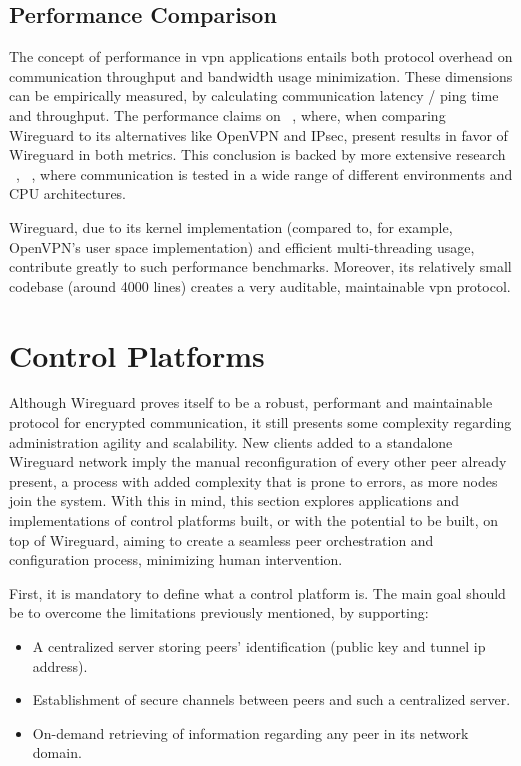\documentclass[11pt,twoside,a4paper]{report}
\begin{document}
\subsection{Performance Comparison}

The concept of performance in \ac{vpn} applications entails both protocol overhead on communication throughput and bandwidth usage minimization. These dimensions can be empirically measured, by calculating communication latency / ping time and throughput. The performance claims on ~\cite{donenfeld2017wireguard}, where, when comparing Wireguard to its alternatives like OpenVPN and IPsec, present results in favor of Wireguard in both metrics. This conclusion is backed by more extensive research ~\cite{mackey2020performance}, ~\cite{osswald2020performance}, where communication is tested in a wide range of different environments and CPU architectures.

Wireguard, due to its kernel implementation (compared to, for example, OpenVPN's user space implementation) and efficient multi-threading usage, contribute greatly to such performance benchmarks. Moreover, its relatively small codebase (around 4000 lines) creates a very auditable, maintainable \ac{vpn} protocol.


\section{Control Platforms}

Although Wireguard proves itself to be a robust, performant and maintainable protocol for encrypted communication, it still presents some complexity regarding administration agility and scalability. New clients added to a standalone Wireguard network imply the manual reconfiguration of every other peer already present, a process with added complexity that is prone to errors, as more nodes join the system. With this in mind, this section explores applications and implementations of control platforms built, or with the potential to be built, on top of Wireguard, aiming to create a seamless peer orchestration and configuration process, minimizing human intervention.

First, it is mandatory to define what a control platform is. The main goal should be to overcome the limitations previously mentioned, by supporting:

\begin{itemize}
     \item A centralized server storing peers' identification (public key and tunnel \ac{ip} address).
     \item Establishment of secure channels between peers and such a centralized server.
     \item On-demand retrieving of information regarding any peer in its network domain.
\end{itemize}
\end{document}
